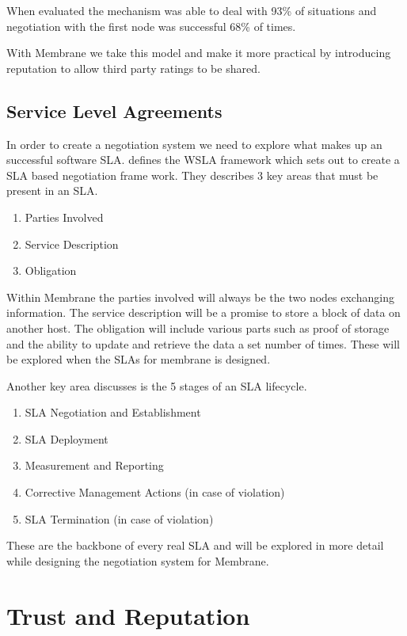 \documentclass[11pt, a4paper, twocolumn, twoside]{report}
\begin{document}
When evaluated the mechanism was able to deal with 93\% of situations and negotiation with the first node was successful 68\% of times. \citep{herrero2007agents}

With Membrane we take this model and make it more practical by introducing reputation to allow third party ratings to be shared.

\subsection{Service Level Agreements}

In order to create a negotiation system we need to explore what makes up an successful software SLA. \cite{keller2002defining} defines the WSLA framework which sets out to create a SLA based negotiation frame work.
They describes 3 key areas that must be present in an SLA.
\begin{enumerate}
 \item Parties Involved
 \item Service Description
 \item Obligation
\end{enumerate}
Within Membrane the parties involved will always be the two nodes exchanging information. The service description will be a promise to store a block of data on another host. The obligation will include various parts such as proof of storage and the ability to update and retrieve the data a set number of times. These will be explored when the SLAs for membrane is designed.

Another key area \cite{keller2002defining} discusses is the 5 stages of an SLA lifecycle.
\begin{enumerate}
 \item SLA Negotiation and Establishment
 \item SLA Deployment
 \item Measurement and Reporting
 \item Corrective Management Actions (in case of violation)
 \item SLA Termination (in case of violation)
\end{enumerate}
These are the backbone of every real SLA and will be explored in more detail while designing the negotiation system for Membrane.

\section{Trust and Reputation}
\end{document}
